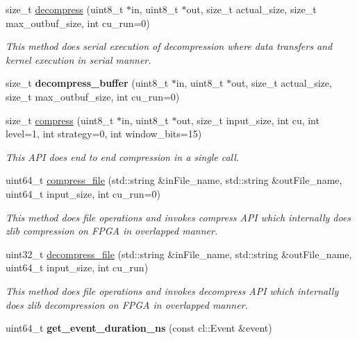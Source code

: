 \begin{DoxyCompactItemize}
size\-\_\-t \hyperlink{classxf_1_1compression_1_1xfZlib_a5dc1443008daebba8e3aa47c1962434a}{decompress} (uint8\-\_\-t $\ast$in, uint8\-\_\-t $\ast$out, size\-\_\-t actual\-\_\-size, size\-\_\-t max\-\_\-outbuf\-\_\-size, int cu\-\_\-run=0)
\begin{DoxyCompactList}\small\item\em This method does serial execution of decompression where data transfers and kernel execution in serial manner. \end{DoxyCompactList}\item 
\hypertarget{classxf_1_1compression_1_1xfZlib_a25be136469b32af77df2e6b382cf72a9}{size\-\_\-t {\bfseries decompress\-\_\-buffer} (uint8\-\_\-t $\ast$in, uint8\-\_\-t $\ast$out, size\-\_\-t actual\-\_\-size, size\-\_\-t max\-\_\-outbuf\-\_\-size, int cu\-\_\-run=0)}\label{classxf_1_1compression_1_1xfZlib_a25be136469b32af77df2e6b382cf72a9}

\item 
size\-\_\-t \hyperlink{classxf_1_1compression_1_1xfZlib_aed3a52d3bcb4e2603d367a559c85e175}{compress} (uint8\-\_\-t $\ast$in, uint8\-\_\-t $\ast$out, size\-\_\-t input\-\_\-size, int cu, int level=1, int strategy=0, int window\-\_\-bits=15)
\begin{DoxyCompactList}\small\item\em This A\-P\-I does end to end compression in a single call. \end{DoxyCompactList}\item 
uint64\-\_\-t \hyperlink{classxf_1_1compression_1_1xfZlib_a4dae7f3471aa3788ffc0c11a9b6196fc}{compress\-\_\-file} (std\-::string \&in\-File\-\_\-name, std\-::string \&out\-File\-\_\-name, uint64\-\_\-t input\-\_\-size, int cu\-\_\-run=0)
\begin{DoxyCompactList}\small\item\em This method does file operations and invokes compress A\-P\-I which internally does zlib compression on F\-P\-G\-A in overlapped manner. \end{DoxyCompactList}\item 
uint32\-\_\-t \hyperlink{classxf_1_1compression_1_1xfZlib_a847206ba337f6811dbd477c1533586c3}{decompress\-\_\-file} (std\-::string \&in\-File\-\_\-name, std\-::string \&out\-File\-\_\-name, uint64\-\_\-t input\-\_\-size, int cu\-\_\-run)
\begin{DoxyCompactList}\small\item\em This method does file operations and invokes decompress A\-P\-I which internally does zlib decompression on F\-P\-G\-A in overlapped manner. \end{DoxyCompactList}\item 
\hypertarget{classxf_1_1compression_1_1xfZlib_aa2477f22a23fc8ce1ffa8c968c588f29}{uint64\-\_\-t {\bfseries get\-\_\-event\-\_\-duration\-\_\-ns} (const cl\-::\-Event \&event)}\label{classxf_1_1compression_1_1xfZlib_aa2477f22a23fc8ce1ffa8c968c588f29}


\end{DoxyCompactItemize}
